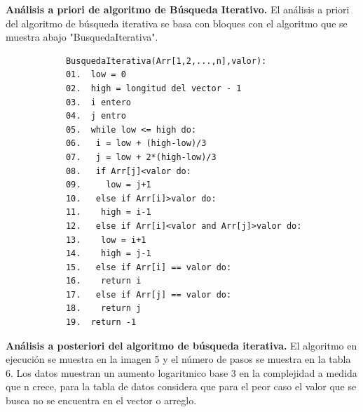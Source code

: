 \documentclass[12pt,twoside]{article}
\begin{document}
\textbf{Análisis a priori de algoritmo de Búsqueda Iterativo.} 
El análisis a priori del algoritmo de búsqueda iterativa se basa con bloques con el algoritmo que se muestra abajo "BusquedaIterativa". 
\par
\begin{center}
  \begin{verbatim}
            BusquedaIterativa(Arr[1,2,...,n],valor):
            01.  low = 0
            02.  high = longitud del vector - 1
            03.  i entero 
            04.  j entro
            05.  while low <= high do:
            06.   i = low + (high-low)/3
            07.   j = low + 2*(high-low)/3
            08.   if Arr[j]<valor do:
            09.     low = j+1
            10.   else if Arr[i]>valor do:
            11.    high = i-1
            12.   else if Arr[i]<valor and Arr[j]>valor do:
            13.    low = i+1
            14.    high = j-1
            15.   else if Arr[i] == valor do:
            16.    return i
            17.   else if Arr[j] == valor do:
            18.    return j
            19.  return -1
  \end{verbatim}
  \end{center}

\medskip

\textbf{Análisis a posteriori del algoritmo de búsqueda iterativa.}
El algoritmo en ejecución se muestra en la imagen 5 y el número de pasos se muestra en la tabla 6. Los datos
muestran un aumento logaritmico base 3 en la complejidad a medida que n crece, para la tabla de datos considera
que para el peor caso el valor que se busca no se encuentra en el vector o arreglo.
\par
\end{document}
